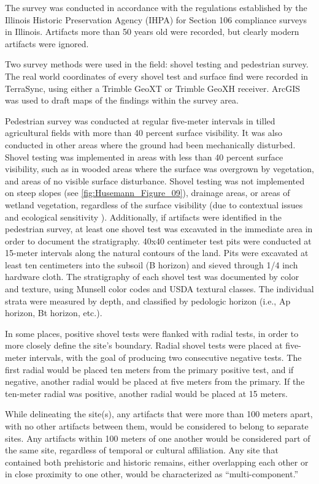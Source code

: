 The survey was conducted in accordance with the regulations established by the Illinois Historic Preservation Agency (IHPA) for Section 106 compliance surveys in Illinois. Artifacts more than 50 years old were recorded, but clearly modern artifacts were ignored.

Two survey methods were used in the field: shovel testing and pedestrian survey. The real world coordinates of every shovel test and surface find were recorded in TerraSync, using either a Trimble GeoXT or Trimble GeoXH receiver. ArcGIS was used to draft maps of the findings within the survey area.

Pedestrian survey was conducted at regular five-meter intervals in tilled agricultural fields with more than 40 percent surface visibility. It was also conducted in other areas where the ground had been mechanically disturbed.
Shovel testing was implemented in areas with less than 40 percent surface visibility, such as in wooded areas where the surface was overgrown by vegetation, and areas of no visible surface disturbance. Shovel testing was not implemented on steep slopes (see \cref{fig:Husemann_Figure_09}), drainage areas, or areas of wetland vegetation, regardless of the surface visibility (due to contextual issues and ecological sensitivity ). Additionally, if artifacts were identified in the pedestrian survey, at least one shovel test was excavated in the immediate area in order to document the stratigraphy.
40x40 centimeter test pits were conducted at 15-meter intervals along the natural contours of the land. Pits were excavated at least ten centimeters into the subsoil (B horizon) and sieved through 1/4 inch hardware cloth. The stratigraphy of each shovel test was documented by color and texture, using Munsell color codes and USDA textural classes. The individual strata were measured by depth, and classified by pedologic horizon (i.e., Ap horizon, Bt horizon, etc.).

In some places, positive shovel tests were flanked with radial tests, in order to more closely define the site’s boundary. Radial shovel tests were placed at five-meter intervals, with the goal of producing two consecutive negative tests. The first radial would be placed ten meters from the primary positive test, and if negative, another radial would be placed at five meters from the primary. If the ten-meter radial was positive, another radial would be placed at 15 meters.

While delineating the site(s), any artifacts that were more than 100 meters apart, with no other artifacts between them, would be considered to belong to separate sites. Any artifacts within 100 meters of one another would be considered part of the same site, regardless of temporal or cultural affiliation. Any site that contained both prehistoric and historic remains, either overlapping each other or in close proximity to one other, would be characterized as “multi-component.”

